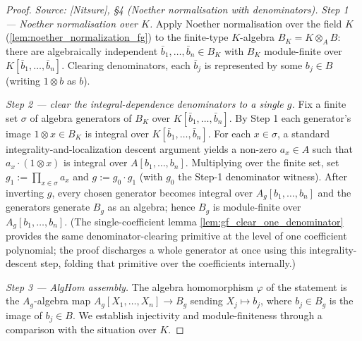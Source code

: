 \begin{proof}
  \leanok
  \textit{Source: [Nitsure], \S4 (Noether normalisation with denominators).}
  \emph{Step 1 — Noether normalisation over \(K\).} Apply Noether normalisation over the
  field \(K\) (\cref{lem:noether_normalization_fg}) to the finite-type \(K\)-algebra
  \(B_K = K \otimes_A B\): there are algebraically independent
  \(\bar b_1, \dots, \bar b_n \in B_K\) with \(B_K\) module-finite over
  \(K[\bar b_1, \dots, \bar b_n]\). Clearing denominators, each \(\bar b_j\) is
  represented by some \(b_j \in B\) (writing \(1 \otimes b\) as \(b\)).

  \emph{Step 2 — clear the integral-dependence denominators to a single \(g\).} Fix a
  finite set \(\sigma\) of algebra generators of \(B_K\) over
  \(K[\bar b_1, \dots, \bar b_n]\). By Step 1 each generator's image
  \(1 \otimes x \in B_K\) is integral over \(K[\bar b_1, \dots, \bar b_n]\). For each
  \(x \in \sigma\), a standard integrality-and-localization descent argument yields a
  non-zero \(a_x \in A\) such that \(a_x \cdot (1 \otimes x)\)
  is integral over \(A[b_1, \dots, b_n]\). Multiplying over the finite
  set, set \(g_1 := \prod_{x \in \sigma} a_x\) and \(g := g_0 \cdot g_1\) (with \(g_0\) the
  Step-1 denominator witness). After inverting \(g\), every chosen generator becomes
  integral over \(A_g[b_1, \dots, b_n]\) and the generators generate \(B_g\) as an algebra;
  hence \(B_g\) is module-finite over \(A_g[b_1, \dots, b_n]\). (The single-coefficient
  lemma \cref{lem:gf_clear_one_denominator} provides the same denominator-clearing primitive
  at the level of one coefficient polynomial; the proof discharges a whole generator
  at once using this integrality-descent step, folding that primitive over the coefficients
  internally.)

  \emph{Step 3 — AlgHom assembly.} The algebra homomorphism \(\varphi\) of the statement
  is the \(A_g\)-algebra map \(A_g[X_1, \dots, X_n] \to B_g\) sending \(X_j \mapsto b_j\),
  where \(b_j \in B_g\) is the image of \(b_j \in B\). We establish injectivity and
  module-finiteness through a comparison with the situation over \(K\).


\end{proof}
